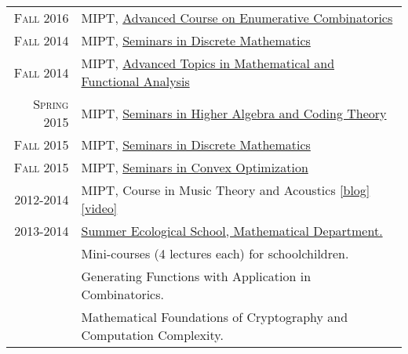 \documentclass[a4paper,10pt]{article} %
\begin{document}
\begin{tabular}{rl}
\textsc{Fall} 2016 & MIPT,
\href{https://github.com/Electric-tric/mipt-teach-enum-comb}{Advanced Course on Enumerative Combinatorics} \\
\textsc{Fall} 2014 & MIPT, \href{https://drive.google.com/folderview?id=0B733JIZxEnkNVFJ1azljVmtpTDA&usp=sharing}{Seminars in Discrete Mathematics} \\
\textsc{Fall 2014} & MIPT, \href{https://drive.google.com/folderview?id=0B733JIZxEnkNdnJ4S1JWTlJRQjA&usp=sharing}{Advanced Topics in Mathematical and Functional Analysis} \\
\textsc{Spring} 2015 & MIPT, \href{https://drive.google.com/folderview?id=0B733JIZxEnkNM1NLVE96dXJGT1k&usp=sharing}{Seminars in Higher Algebra and Coding Theory} \\
\textsc{Fall} 2015 & MIPT, \href{https://drive.google.com/folderview?id=0B733JIZxEnkNRFhQdW5Nak5FRUU&usp=sharing}{Seminars in Discrete Mathematics} \\
\textsc{Fall} 2015 & MIPT, \href{https://drive.google.com/folderview?id=0B733JIZxEnkNWVVDVjdYVk1tclE&usp=sharing}{Seminars in Convex Optimization} \\
2012-2014 & MIPT, Course in Music Theory and Acoustics \href{http://vk.com/theormus}{[blog]} \href{http://www.youtube.com/channel/UC_D60LCndYzZWxr_ZgRhQ0Q}{[video]} \\
2013-2014 & \href{https://sites.google.com/site/maolesh/study/kursy-procitannye-na-les-2013}{Summer Ecological School, Mathematical Department.}\\
& Mini-courses (4 lectures each) for schoolchildren. \\
& Generating Functions with Application in Combinatorics.\\
& Mathematical Foundations of Cryptography and Computation Complexity.
\end{tabular}


%
\end{document}
